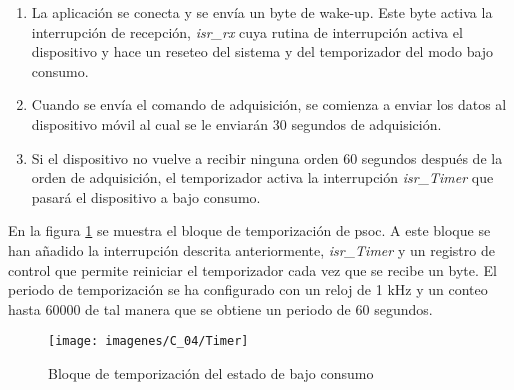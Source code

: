 \begin{enumerate}
\item La aplicación se conecta y se envía un byte de wake-up. Este byte activa la interrupción de recepción, \textit{isr\_rx} cuya rutina de interrupción activa el dispositivo y hace un reseteo del sistema y del temporizador del modo bajo consumo.
\item Cuando se envía el comando de adquisición, se comienza a enviar los datos al dispositivo móvil al cual se le enviarán 30 segundos de adquisición. 
\item Si el dispositivo no vuelve a recibir ninguna orden 60 segundos después de la orden de adquisición, el temporizador activa la interrupción \textit{isr\_Timer} que pasará el dispositivo a bajo consumo.
\end{enumerate}

En la figura  \ref{fig:Timer} se muestra el bloque de temporización de \acrshort{psoc}. A este bloque se han añadido la interrupción descrita anteriormente, \textit{isr\_Timer} y un registro de control que permite reiniciar el temporizador cada vez que se recibe un byte. El periodo de temporización se ha configurado con un reloj de 1 kHz y un conteo hasta 60000 de tal manera que se obtiene un periodo de 60 segundos.

\begin{figure}[!ht]
	\center
	\texttt{[image: imagenes/C\_04/Timer]}
	\caption{Bloque de temporización del estado de bajo consumo}
	\label{fig:Timer}
\end{figure}





%
%

